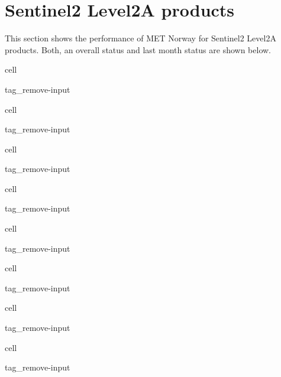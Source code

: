 \documentclass[letterpaper,10pt,english]{jupyterBook}
\begin{document}
\chapter{Sentinel\sphinxhyphen{}2 Level\sphinxhyphen{}2A products}
\label{\detokenize{S2L2A_portals:sentinel-2-level-2a-products}}\label{\detokenize{S2L2A_portals::doc}}
\sphinxAtStartPar
This section shows the performance of MET Norway for Sentinel\sphinxhyphen{}2 Level\sphinxhyphen{}2A products. Both, an overall status and last month status are shown below.

\begin{sphinxuseclass}{cell}
\begin{sphinxuseclass}{tag_remove-input}
\end{sphinxuseclass}
\end{sphinxuseclass}
\begin{sphinxuseclass}{cell}
\begin{sphinxuseclass}{tag_remove-input}
\end{sphinxuseclass}
\end{sphinxuseclass}
\begin{sphinxuseclass}{cell}
\begin{sphinxuseclass}{tag_remove-input}
\end{sphinxuseclass}
\end{sphinxuseclass}
\begin{sphinxuseclass}{cell}
\begin{sphinxuseclass}{tag_remove-input}
\end{sphinxuseclass}
\end{sphinxuseclass}
\begin{sphinxuseclass}{cell}
\begin{sphinxuseclass}{tag_remove-input}
\end{sphinxuseclass}
\end{sphinxuseclass}
\begin{sphinxuseclass}{cell}
\begin{sphinxuseclass}{tag_remove-input}
\end{sphinxuseclass}
\end{sphinxuseclass}
\begin{sphinxuseclass}{cell}
\begin{sphinxuseclass}{tag_remove-input}
\end{sphinxuseclass}
\end{sphinxuseclass}
\begin{sphinxuseclass}{cell}
\begin{sphinxuseclass}{tag_remove-input}
\end{sphinxuseclass}
\end{sphinxuseclass}
\end{document}
